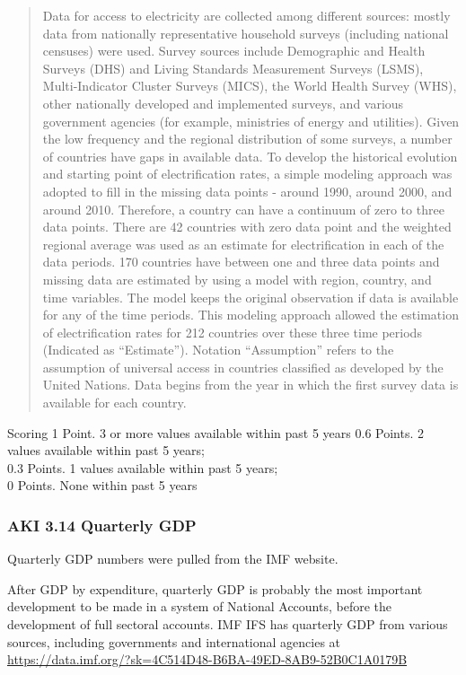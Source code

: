 \documentclass[]{article}
\begin{document}
\begin{quote}
Data for access to electricity are collected among different sources:
mostly data from nationally representative household surveys (including
national censuses) were used. Survey sources include Demographic and
Health Surveys (DHS) and Living Standards Measurement Surveys (LSMS),
Multi-Indicator Cluster Surveys (MICS), the World Health Survey (WHS),
other nationally developed and implemented surveys, and various
government agencies (for example, ministries of energy and utilities).
Given the low frequency and the regional distribution of some surveys, a
number of countries have gaps in available data. To develop the
historical evolution and starting point of electrification rates, a
simple modeling approach was adopted to fill in the missing data points
- around 1990, around 2000, and around 2010. Therefore, a country can
have a continuum of zero to three data points. There are 42 countries
with zero data point and the weighted regional average was used as an
estimate for electrification in each of the data periods. 170 countries
have between one and three data points and missing data are estimated by
using a model with region, country, and time variables. The model keeps
the original observation if data is available for any of the time
periods. This modeling approach allowed the estimation of
electrification rates for 212 countries over these three time periods
(Indicated as ``Estimate''). Notation ``Assumption'' refers to the
assumption of universal access in countries classified as developed by
the United Nations. Data begins from the year in which the first survey
data is available for each country.
\end{quote}

Scoring 1 Point. 3 or more values available within past 5 years 0.6
Points. 2 values available within past 5 years;\\
0.3 Points. 1 values available within past 5 years;\\
0 Points. None within past 5 years

\hypertarget{aki-3.14-quarterly-gdp}{%
\subsubsection{AKI 3.14 Quarterly GDP}\label{aki-3.14-quarterly-gdp}}

Quarterly GDP numbers were pulled from the IMF website.

After GDP by expenditure, quarterly GDP is probably the most important
development to be made in a system of National Accounts, before the
development of full sectoral accounts. IMF IFS has quarterly GDP from
various sources, including governments and international agencies at
\url{https://data.imf.org/?sk=4C514D48-B6BA-49ED-8AB9-52B0C1A0179B}
\end{document}
